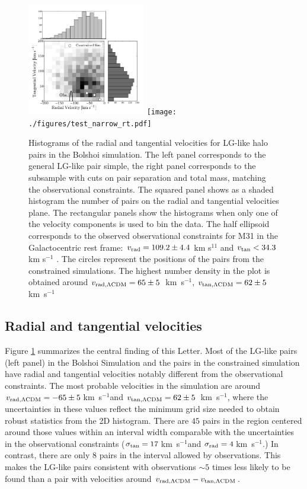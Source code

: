 \documentclass{emulateapj}
\newcommand{\kms}{\,km~s$^{-1}$}
\begin{document}
\begin{figure}
\begin{center}
\includegraphics[keepaspectratio=true,width=0.46\textwidth]{./figures/test_rt.pdf}
\texttt{[image: ./figures/test\_narrow\_rt.pdf]}
\caption{Histograms of the radial and tangential velocities for LG-like halo pairs in the Bolshoi simulation. The left panel corresponds to the general LG-like pair simple, the right panel corresponds to the subsample with cuts on pair separation and total mass, matching the observational constraints. The squared panel shows as a shaded histogram the number of pairs on the radial and tangential velocities plane. The rectangular panels show the histograms when only one of the velocity components is used to bin the data. The half ellipsoid corresponds to the observed observational constraints for M31 in the Galactocentric rest frame: $v_{\rm rad}=109.2\pm 4.4$ km s$^{11}$ and $v_{\rm tan}< 34.3$ km s$^{-1}$ \citep{vanderMarel12}. The circles represent the positions of the pairs from the constrained simulations. The highest number density in the plot is obtained around $v_{\rm rad,\Lambda CDM} = 65\pm5$ \kms, $v_{\rm tan,\Lambda CDM} = 62\pm5$ \kms}
\label{fig:rt}
\end{center}

\end{figure}


\subsection{Radial and tangential velocities}

Figure \ref{fig:rt} summarizes the central finding of this Letter. Most of the LG-like pairs (left panel) in the Bolshoi Simulation and the pairs in the constrained simulation have radial and tangential velocities notably different from the observational constraints.  The most probable velocities in the simulation are around $v_{\rm rad,\Lambda CDM} = -65\pm5$\kms and $v_{\rm tan,\Lambda CDM} = 62\pm5$ \kms, where the uncertainties in these values reflect the minimum grid size needed to obtain robust statistics from the 2D histogram. There are $45$ pairs in the region centered around those values within an interval width comparable with the uncertainties in the observational constraints ($\sigma_{\rm tan}=17$\kms and $\sigma_{\rm rad}=4$\kms.) In contrast, there are only $8$ pairs in the interval allowed by observations. This makes the LG-like pairs consistent with observations $\sim5$ times less likely to be found than a pair with velocities around $v_{\rm rad,\Lambda CDM}-v_{\rm tan,\Lambda CDM}$.
\end{document}
